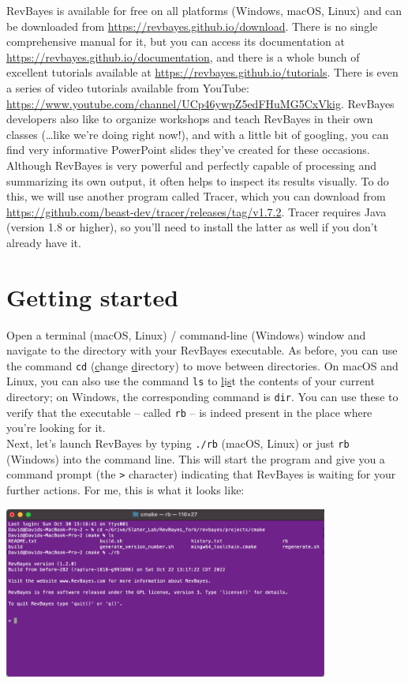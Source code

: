 \documentclass[12pt]{article}
\begin{document}
\noindent RevBayes is available for free on all platforms (Windows, macOS, Linux) and can be downloaded from \url{https://revbayes.github.io/download}. There is no single comprehensive manual for it, but you can access its documentation at \url{https://revbayes.github.io/documentation}, and there is a whole bunch of excellent tutorials available at \url{https://revbayes.github.io/tutorials}. There is even a series of video tutorials available from YouTube: \url{https://www.youtube.com/channel/UCp46ywpZ5edFHuMG5CxVkig}. RevBayes developers also like to organize workshops and teach RevBayes in their own classes (\ldots like we're doing right now!), and with a little bit of googling, you can find very informative PowerPoint slides they've created for these occasions. \\

\noindent Although RevBayes is very powerful and perfectly capable of processing and summarizing its own output, it often helps to inspect its results visually. To do this, we will use another program called Tracer, which you can download from \url{https://github.com/beast-dev/tracer/releases/tag/v1.7.2}. Tracer requires Java (version 1.8 or higher), so you'll need to install the latter as well if you don't already have it.

\section*{Getting started}

Open a terminal (macOS, Linux) / command-line (Windows) window and navigate to the directory with your RevBayes executable. As before, you can use the command \texttt{cd} (\ul{c}hange \ul{d}irectory) to move between directories. On macOS and Linux, you can also use the command \texttt{ls} to \ul{l}i\ul{s}t the contents of your current directory; on Windows, the corresponding command is \texttt{dir}. You can use these to verify that the executable -- called \texttt{rb} -- is indeed present in the place where you're looking for it. \\

\noindent Next, let's launch RevBayes by typing \texttt{./rb} (macOS, Linux) or just \texttt{rb} (Windows) into the command line. This will start the program and give you a command prompt (the \texttt{>} character) indicating that RevBayes is waiting for your further actions. For me, this is what it looks like: \\

\begin{center}
\noindent\includegraphics[width=0.8\textwidth]{revbayes-prompt.png}
\end{center}
\end{document}
